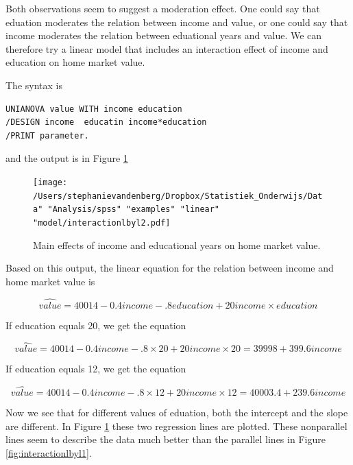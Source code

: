 \documentclass[]{book}\usepackage[]{graphicx}\usepackage[]{color}
\begin{document}
Both observations seem to suggest a moderation effect. One could say that eduation moderates the relation between income and value, or one could say that income moderates the relation between eduational years and value. We can therefore try a linear model that includes an interaction effect of income and education on home market value. 

The syntax is 

\begin{verbatim}
UNIANOVA value WITH income education
/DESIGN income  educatin income*education
/PRINT parameter.
\end{verbatim}

and the output is in Figure \ref{fig:interactionlbyl2}

\begin{figure}[h]
    \begin{center}
       \texttt{[image: /Users/stephanievandenberg/Dropbox/Statistiek\_Onderwijs/Data" "Analysis/spss" "examples"  "linear" "model/interactionlbyl2.pdf]}
    \end{center}
    \label{fig:interactionlbyl2}
    \caption{Main effects of income and educational years on home market value.}
\end{figure}

Based on this output, the linear equation for the relation between income and home market value is 

\begin{equation}
\widehat{value}= 40014 -0.4 income -.8 education + 20 income \times education
\end{equation}

If education equals 20, we get the equation

\begin{equation}
\widehat{value}= 40014 -0.4 income -.8 \times 20 + 20 income \times 20 = 39998 + 399.6 income
\end{equation}

If education equals 12, we get the equation 

\begin{equation}
\widehat{value}= 40014 - 0.4 income -.8 \times 12 + 20 income \times 12 = 40003.4 + 239.6 income
\end{equation}

Now we see that for different values of eduation, both the intercept and the slope are different. In Figure \ref{fig:interactionlbyl2} these two regression lines are plotted. These nonparallel lines seem to describe the data much better than the parallel lines in Figure \ref{fig:interactionlbyl1}. 
\end{document}

